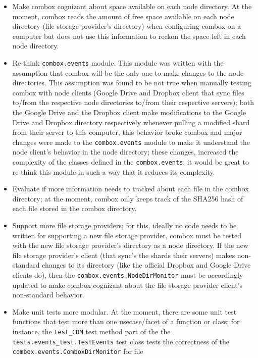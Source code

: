 \begin{itemize}
\item Make combox cognizant about space available on each node
  directory. At the moment, combox reads the amount of free space
  available on each node directory (file storage provider's directory)
  when configuring combox on a computer but does not use this
  information to reckon the space left in each node directory.
\item Re-think \verb+combox.events+ module. This module was written
  with the assumption that combox will be the only one to make changes
  to the node directories. This assumption was found to be not true
  when manually testing combox with node clients (Google Drive and
  Dropbox client that sync files to/from the respective node
  directories to/from their respective servers); both the Google Drive
  and the Dropbox client make modifications to the Google Drive and
  Dropbox directory respectively whenever pulling a modified shard
  from their server to this computer, this behavior broke combox and
  major changes were made to the \verb+combox.events+ module to make
  it understand the node client's behavior in the node directory;
  these changes, increased the complexity of the classes defined in
  the \verb+combox.events+; it would be great to re-think this module
  in such a way that it reduces its complexity.
\item Evaluate if more information needs to tracked about each file in
  the combox directory; at the moment, combox only keeps track of the
  SHA256 hash of each file stored in the combox directory.
\item Support more file storage providers; for this, ideally no code
  needs to be written for supporting a new file storage provider,
  combox must be tested with the new file storage provider's directory
  as a node directory. If the new file storage provider's client (that
  sync's the shards their servers) makes non-standard changes to its
  directory (like the official Dropbox and Google Drive clients do),
  then the \verb+combox.events.NodeDirMonitor+ must be accordingly
  updated to make combox cognizant about the file storage provider
  client's non-standard behavior.
\item Make unit tests more modular. At the moment, there are some unit
  test functions that test more than one usecase/facet of a function
  or class; for instance, the \verb+test_CDM+ test method part of the
  the \verb+tests.events_test.TestEvents+ test class tests the
  correctness of the \verb+combox.events.ComboxDirMonitor+ for file

\end{itemize}
